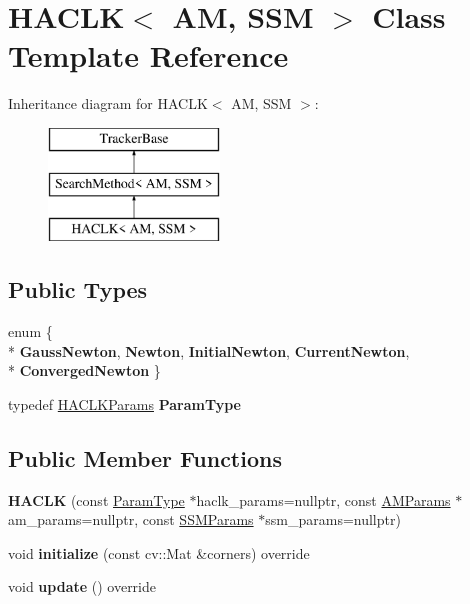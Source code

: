 \hypertarget{classHACLK}{\section{H\-A\-C\-L\-K$<$ A\-M, S\-S\-M $>$ Class Template Reference}
\label{classHACLK}
}
Inheritance diagram for H\-A\-C\-L\-K$<$ A\-M, S\-S\-M $>$\-:\begin{figure}[H]
\begin{center}
\leavevmode
\includegraphics[height=3.000000cm]{classHACLK}
\end{center}
\end{figure}
\subsection*{Public Types}
\begin{DoxyCompactItemize}
\item 
enum \{ \\*
{\bfseries Gauss\-Newton}, 
{\bfseries Newton}, 
{\bfseries Initial\-Newton}, 
{\bfseries Current\-Newton}, 
\\*
{\bfseries Converged\-Newton}
 \}
\item 
\hypertarget{classHACLK_aea5c88e5ed26c6b5f3914dd6a333535e}{typedef \hyperlink{structHACLKParams}{H\-A\-C\-L\-K\-Params} {\bfseries Param\-Type}}\label{classHACLK_aea5c88e5ed26c6b5f3914dd6a333535e}

\end{DoxyCompactItemize}
\subsection*{Public Member Functions}
\begin{DoxyCompactItemize}
\item 
\hypertarget{classHACLK_af2729c6008639b5009212214780a5899}{{\bfseries H\-A\-C\-L\-K} (const \hyperlink{structHACLKParams}{Param\-Type} $\ast$haclk\-\_\-params=nullptr, const \hyperlink{structAMParams}{A\-M\-Params} $\ast$am\-\_\-params=nullptr, const \hyperlink{structSSMParams}{S\-S\-M\-Params} $\ast$ssm\-\_\-params=nullptr)}\label{classHACLK_af2729c6008639b5009212214780a5899}

\item 
\hypertarget{classHACLK_ab2ebdfe87be6bd27d88e64739b6287b1}{void {\bfseries initialize} (const cv\-::\-Mat \&corners) override}\label{classHACLK_ab2ebdfe87be6bd27d88e64739b6287b1}

\item 
\hypertarget{classHACLK_aee3c321d63b71822ed51fcec04b219e5}{void {\bfseries update} () override}\label{classHACLK_aee3c321d63b71822ed51fcec04b219e5}

\end{DoxyCompactItemize}
